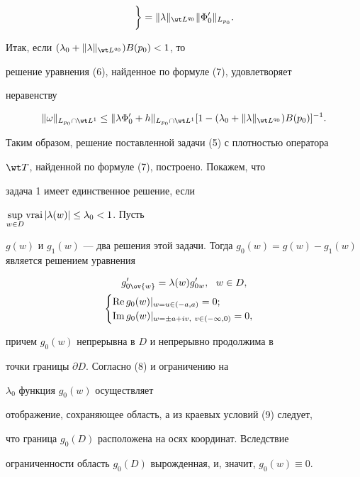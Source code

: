 \begin{pf}
\begin{multline*}
\bigg\} =\|\lambda\|_{\wt L^{q_0}} \|\Phi_0'\|_{L_{p_0}}.


\end{multline*}


Итак, если $(\lambda_0 + \|\lambda\|_{\wt L^{q_0}}) B(p_0) < 1$, то


решение уравнения (6), найденное по формуле (7), удовлетворяет


неравенству


$$


\|\omega\|_{L_{p_0} \cap \wt L^1} \leq \|\lambda \Phi'_0 + h\|_{L_{p_0}


\cap \wt L^1} [1 - (\lambda_0 + \|\lambda\|_{\wt L^{q_0}}) B(p_0)]^{-1}.


$$





Таким образом, решение поставленной задачи (5) с плотностью оператора


$\wt T$, найденной по формуле (7), построено. Покажем, что


задача 1 имеет единственное решение, если


$\sup\limits_{w \in D} \operatorname{vrai} |\lambda(w)| \leq \lambda_0 <1$. Пусть


$g(w)$ и $g_1(w)$ --- два решения этой задачи. Тогда $g_0(w) = g(w) -


g_1(w)$ является решением уравнения


\begin{gather}


g'_{0 \ov{w}} = \lambda(w) g'_{0 w},\ \ w \in D, \\


%


\begin{cases}


\re g_0(w)|_{w=u\in (-a, a)} = 0;\\


\im g_0(w)|_{w=\pm a + iv,\ v \in (-\infty,0)} = 0,


\end{cases}


\end{gather}


причем $g_0(w)$ непрерывна в $D$ и непрерывно продолжима в


точки границы $\partial D$. Согласно (8) и ограничению на


$\lambda_0$ функция $g_0(w)$ осуществляет


отображение, сохраняющее область, а из краевых условий (9) следует,


что граница $g_0(D)$ расположена на осях координат. Вследствие


ограниченности область $g_0(D)$ вырожденная, и, значит, $g_0(w) \equiv0$.


\end{pf}






